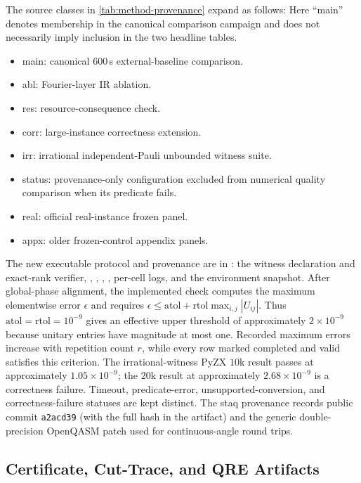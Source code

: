 The source classes in \cref{tab:method-provenance} expand as follows:
Here ``main'' denotes membership in the canonical comparison campaign and does
not necessarily imply inclusion in the two headline tables.
\begin{itemize}[leftmargin=1.5em]
    \item main: canonical 600\,s external-baseline comparison.
    \item abl: Fourier-layer IR ablation.
    \item res: resource-consequence check.
    \item corr: large-instance correctness extension.
    \item irr: irrational independent-Pauli unbounded witness suite.
    \item status: provenance-only configuration excluded from numerical
    quality comparison when its predicate fails.
    \item real: official real-instance frozen panel.
    \item appx: older frozen-control appendix panels.
\end{itemize}

The new executable protocol and provenance are in
: the witness declaration and exact-rank
verifier, ,
,
,
, per-cell logs, and the environment
snapshot. After global-phase alignment, the implemented check computes the
maximum elementwise error $\epsilon$ and requires
$\epsilon \leq \mathrm{atol}+\mathrm{rtol}\max_{i,j}|U_{ij}|$. Thus
$\mathrm{atol}=\mathrm{rtol}=10^{-9}$ gives an effective upper threshold of
approximately $2\times10^{-9}$ because unitary entries have magnitude at most
one. Recorded maximum errors increase with repetition count $r$, while every
row marked completed and valid satisfies this criterion. The irrational-witness
PyZX $10$k result passes at approximately $1.05\times10^{-9}$; the $20$k result
at approximately $2.68\times10^{-9}$ is a correctness failure. Timeout,
predicate-error, unsupported-conversion, and correctness-failure statuses are
kept distinct. The staq provenance records
public commit \texttt{a2acd39} (with the full hash in the artifact) and the
generic double-precision OpenQASM patch used for continuous-angle round trips.

\subsection{Certificate, Cut-Trace, and QRE Artifacts}

